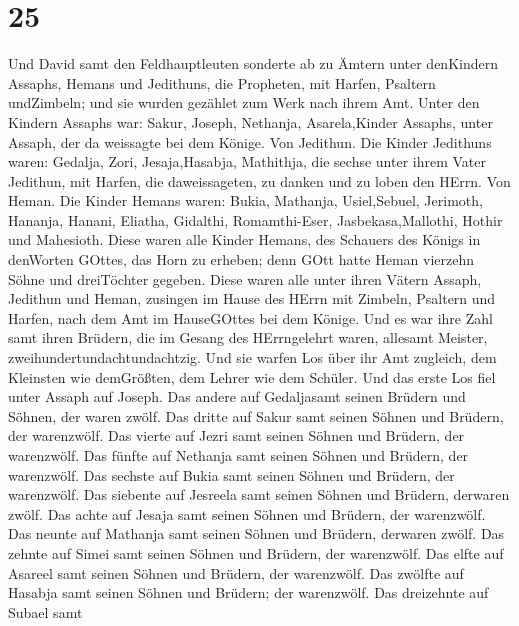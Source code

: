\hypertarget{section-24}{%
\section{25}\label{section-24}}

 Und David samt den Feldhauptleuten sonderte ab zu Ämtern
unter denKindern Assaphs, Hemans und Jedithuns, die Propheten, mit
Harfen, Psaltern undZimbeln; und sie wurden gezählet zum Werk nach ihrem
Amt.  Unter den Kindern Assaphs war: Sakur, Joseph,
Nethanja, Asarela,Kinder Assaphs, unter Assaph, der da weissagte bei dem
Könige.  Von Jedithun. Die Kinder Jedithuns waren: Gedalja,
Zori, Jesaja,Hasabja, Mathithja, die sechse unter ihrem Vater Jedithun,
mit Harfen, die daweissageten, zu danken und zu loben den HErrn.
 Von Heman. Die Kinder Hemans waren: Bukia, Mathanja,
Usiel,Sebuel, Jerimoth, Hananja, Hanani, Eliatha, Gidalthi,
Romamthi-Eser, Jasbekasa,Mallothi, Hothir und Mahesioth. 
Diese waren alle Kinder Hemans, des Schauers des Königs in denWorten
GOttes, das Horn zu erheben; denn GOtt hatte Heman vierzehn Söhne und
dreiTöchter gegeben.  Diese waren alle unter ihren Vätern
Assaph, Jedithun und Heman, zusingen im Hause des HErrn mit Zimbeln,
Psaltern und Harfen, nach dem Amt im HauseGOttes bei dem Könige.
 Und es war ihre Zahl samt ihren Brüdern, die im Gesang des
HErrngelehrt waren, allesamt Meister, zweihundertundachtundachtzig.
 Und sie warfen Los über ihr Amt zugleich, dem Kleinsten wie
demGrößten, dem Lehrer wie dem Schüler.  Und das erste Los
fiel unter Assaph auf Joseph. Das andere auf Gedaljasamt seinen Brüdern
und Söhnen, der waren zwölf.  Das dritte auf Sakur samt
seinen Söhnen und Brüdern, der warenzwölf.  Das vierte auf
Jezri samt seinen Söhnen und Brüdern, der warenzwölf.  Das
fünfte auf Nethanja samt seinen Söhnen und Brüdern, der warenzwölf.
 Das sechste auf Bukia samt seinen Söhnen und Brüdern, der
warenzwölf.  Das siebente auf Jesreela samt seinen Söhnen
und Brüdern, derwaren zwölf.  Das achte auf Jesaja samt
seinen Söhnen und Brüdern, der warenzwölf.  Das neunte auf
Mathanja samt seinen Söhnen und Brüdern, derwaren zwölf. 
Das zehnte auf Simei samt seinen Söhnen und Brüdern, der warenzwölf.
 Das elfte auf Asareel samt seinen Söhnen und Brüdern, der
warenzwölf.  Das zwölfte auf Hasabja samt seinen Söhnen und
Brüdern; der warenzwölf.  Das dreizehnte auf Subael samt
